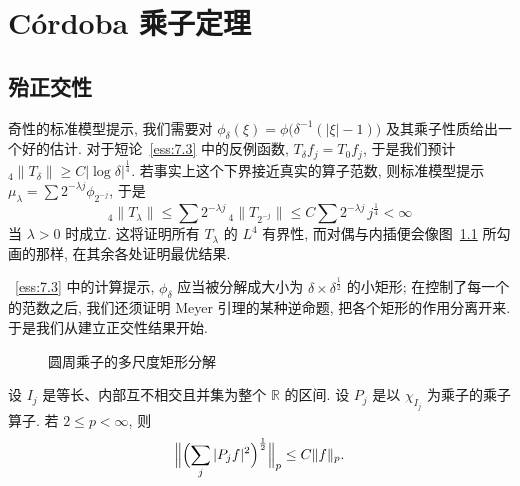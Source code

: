 \chapter{C\'ordoba 乘子定理}
\label{chap:8}

\section{殆正交性}
\label{sec:8.1}

奇性的标准模型提示, 我们需要对 $\phi_{\delta}(\xi)=\phi\bigl(\delta^{-1}(|\xi|-1)\bigr)$ 及其乘子性质给出一个好的估计. 对于短论~\ref*{ess:7.3} 中的反例函数, $T_{\delta}f_j=T_0f_j$, 于是我们预计 ${}_4\|T_{\delta}\|\geq C|\log\delta|^{\frac{1}{4}}$. 若事实上这个下界接近真实的算子范数, 则标准模型提示 $\mu_{\lambda}=\sum 2^{-\lambda j}\phi_{2^{-j}}$, 于是
\[
{}_{4}\|T_{\lambda}\|\leq\sum 2^{-\lambda j}\,{}_4\|T_{2^{-j}}\|\leq C\sum 2^{-\lambda j}\,j^{\frac{1}{4}}<\infty
\]
当 $\lambda>0$ 时成立. 这将证明所有 $T_\lambda$ 的 $L^4$ 有界性, 而对偶与内插便会像图~\ref{fig:12} 所勾画的那样, 在其余各处证明最优结果.

~\ref*{ess:7.3} 中的计算提示, $\phi_{\delta}$ 应当被分解成大小为 $\delta\times\delta^{\frac{1}{2}}$ 的小矩形; 在控制了每一个的范数之后, 我们还须证明 Meyer 引理的某种逆命题, 把各个矩形的作用分离开来. 于是我们从建立正交性结果开始.

\begin{figure}[htbp]
\centering
{}
\caption{圆周乘子的多尺度矩形分解}
\label{fig:12}
\end{figure}

\begin{theorem}\label{thm:8.1}
设 $I_j$ 是等长、内部互不相交且并集为整个 $\mathbb{R}$ 的区间. 设 $P_j$ 是以 $\chi_{I_j}$ 为乘子的乘子算子. 若 $2\leq p<\infty$, 则
\[
\Bigl\|\Bigl(\sum_{j}|P_{j}f|^{2}\Bigr)^{\frac{1}{2}}\Bigr\|_{p}\leq C\|f\|_{p}.
\]
\end{theorem}

